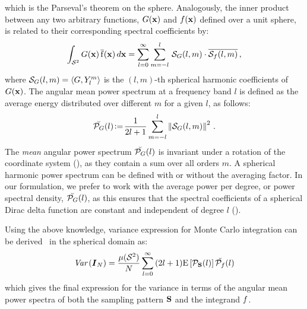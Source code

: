 which is the Parseval's theorem on the sphere. Analogously,
the inner product between any two arbitrary functions, ${G}(\mathbf{x})$ and
${f}(\mathbf{x})$ defined over a unit sphere, is related to their corresponding spectral coefficients by:
%
\begin{equation}
\int_{{\mathcal{S}^{2}}} {G}(\mathbf{x}) \, \mathrm{\overline{{f}}}(\mathbf{x}) \, d\mathbf{x} =
\sum_{l=0}^{\infty} \sum_{m=-l}^{l}\, \mathcal{S}_{{G}}(l,m)\cdot\overline{\mathcal{S}_{{f}}(l,m)}\,,
\end{equation}
%
where $\mathcal{S}_{{G}}(l,m)=\langle{G},Y_l^m\rangle$ is the $(l,m)$-th spherical harmonic coefficients of ${G}(\mathbf{x})$. The angular mean power spectrum at a frequency band $l$ is defined as the average energy distributed over different $m$ for a given $l$, as follows:
%
\begin{equation}
\breve{\mathcal{P}_{{G}}}(l) \!\mathrel{\mathop:}=\! \frac{1}{2l+1} \sum_{m=-l}^{l} \left\|\mathcal{S}_{{G}}(l,m)\right\|^2\,.
\end{equation}
%
The \emph{mean} angular power spectrum $\breve{\mathcal{P}_{{G}}}(l)$ is invariant 
under a rotation of the coordinate system (\cite{Kaula1967,lowes1974spatial}), as they contain a sum over all orders $m$. 
A spherical harmonic power spectrum can be defined with or without the averaging factor. In our formulation, 
we prefer to work with the average power per degree, or power spectral density, $\breve{\mathcal{P}_{{G}}}(l)$, as 
this ensures that the spectral coefficients of a spherical Dirac delta function are constant and independent of degree $l$  (\cite{hipkin2001statistics}). 

%
Using the above knowledge, variance expression for Monte Carlo integration can be derived~\cite{Pilleboue:2015:VAM} in the spherical domain as:
%
\begin{align}
\label{eq:sphere_var_finale}
\textit{Var}\left({\boldsymbol{I}_N}\right) = \frac{{\mu({\mathcal{S}^{2}})}}{N} \sum_{l=0}^{\infty}\, (2l+1) \mathrm{E} \left[\mathcal{P}_{\textbf{S}}(l) \right] \breve{\mathcal{P}_{{f}}}(l)
\end{align}
%
which gives the final expression for the variance in terms of the angular mean power spectra of both the sampling pattern 
$\textbf{S}$ and the integrand ${f}$. 
